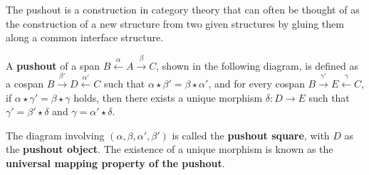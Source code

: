 The pushout is a construction in category theory that can often be thought of as the construction of a new structure from two given structures by gluing them along a common interface structure.
\begin{definition}
    \label{def:cat:po} 
    A \textbf{pushout} of a span \( B \overset{\alpha}{\leftarrow} A \overset{\beta}{\rightarrow} C \), shown in the following diagram,
    is defined as a cospan \( B \overset{\beta'}{\rightarrow} D \overset{\alpha'}{\leftarrow} C \) such that \( \alpha \star \beta' = \beta \star \alpha' \), and for every cospan \( B \overset{\gamma'}{\rightarrow} E \overset{\gamma}{\leftarrow} C \), if \( \alpha \star \gamma' = \beta \star \gamma \) holds, then there exists a unique morphism \(\delta : D \to E\) such that \( \gamma' = \beta' \star \delta \) and \( \gamma = \alpha' \star \delta \).
    \begin{center}
            \end{center}
The diagram involving \( (\alpha, \beta, \alpha', \beta') \) is called the \textbf{pushout square}, with \(D\) as the \textbf{pushout object}. The existence of a unique morphism is known as the \textbf{universal mapping property of the pushout}.
\end{definition} 

